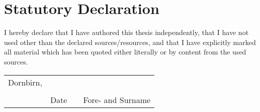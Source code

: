 \chapter*{Statutory Declaration}

I hereby declare that I have authored this thesis independently, that I
have not used other than the declared sources/resources, and that I have
explicitly marked all material which has been quoted either literally or by
content from the used sources.

\vfill

\newcommand{\mysignatureblock}[3]{%
  \begin{tabular}{llp{2em}l}
  #1 & \hspace{4cm}        & & \hspace{5cm} \\\cline{2-2}\cline{4-4}
     &                     & & \\[-3mm]
     & {\footnotesize #2}  & & {\footnotesize #3}
  \end{tabular}
}

\mysignatureblock{Dornbirn,}{Date}{Fore- and Surname}

\vfill\vfill
